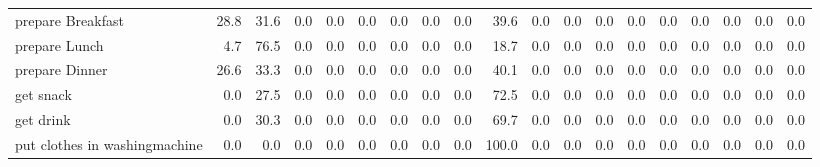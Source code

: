 \documentclass{article}
\begin{document}
\begin{sideways}
\begin{tabular}{lrrrrrrrrrrrrrrrrrr}
prepare Breakfast             &        28.8 &               31.6 &           0.0 &                          0.0 &                0.0 &                0.0 &                        0.0 &          0.0 &             39.6 &                0.0 &                    0.0 &                      0.0 &                  0.0 &                   0.0 &              0.0 &              0.0 &                                  0.0 &          0.0 \\
prepare Lunch                 &         4.7 &               76.5 &           0.0 &                          0.0 &                0.0 &                0.0 &                        0.0 &          0.0 &             18.7 &                0.0 &                    0.0 &                      0.0 &                  0.0 &                   0.0 &              0.0 &              0.0 &                                  0.0 &          0.0 \\
prepare Dinner                &        26.6 &               33.3 &           0.0 &                          0.0 &                0.0 &                0.0 &                        0.0 &          0.0 &             40.1 &                0.0 &                    0.0 &                      0.0 &                  0.0 &                   0.0 &              0.0 &              0.0 &                                  0.0 &          0.0 \\
get snack                     &         0.0 &               27.5 &           0.0 &                          0.0 &                0.0 &                0.0 &                        0.0 &          0.0 &             72.5 &                0.0 &                    0.0 &                      0.0 &                  0.0 &                   0.0 &              0.0 &              0.0 &                                  0.0 &          0.0 \\
get drink                     &         0.0 &               30.3 &           0.0 &                          0.0 &                0.0 &                0.0 &                        0.0 &          0.0 &             69.7 &                0.0 &                    0.0 &                      0.0 &                  0.0 &                   0.0 &              0.0 &              0.0 &                                  0.0 &          0.0 \\
put clothes in washingmachine &         0.0 &                0.0 &           0.0 &                          0.0 &                0.0 &                0.0 &                        0.0 &          0.0 &            100.0 &                0.0 &                    0.0 &                      0.0 &                  0.0 &                   0.0 &              0.0 &              0.0 &                                  0.0 &          0.0 \\

\end{tabular}
\end{sideways}
\end{document}
